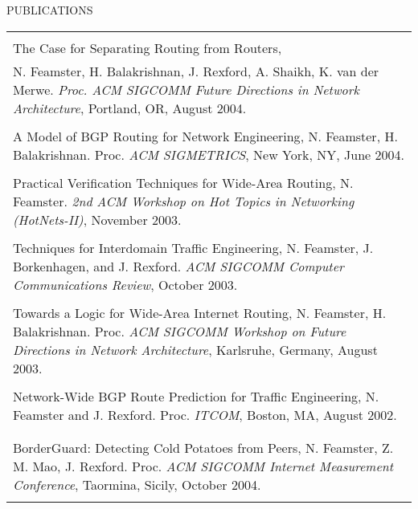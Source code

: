 \documentclass{article}
\begin{document}
\begin{flushleft}
\vspace{0.15 in}
{\ag PUBLICATIONS \hrulefill } \\
\vspace{0.1 in}
\begin{tabular}{p{7 in}}
\\
\hspace{-0.075in}{\bf Interdomain Routing: Modeling and Architecture}\\
{\sc The Case for Separating Routing from Routers}, \\
N. Feamster, H. Balakrishnan, J. Rexford, A. Shaikh, K. van der
Merwe. {\it Proc. ACM SIGCOMM Future Directions in Network
  Architecture}, Portland, OR, August 2004. \\ \\ 


{\sc A Model of BGP Routing for Network Engineering},
N. Feamster, H. Balakrishnan. Proc. {\it ACM
  SIGMETRICS}, New York, NY, June 2004. \\ \\

{\sc Practical Verification Techniques for Wide-Area Routing}, 
N. Feamster. {\it 2nd ACM 
  Workshop on Hot Topics in Networking (HotNets-II)}, November 2003.\\ \\ 

{\sc Techniques for Interdomain Traffic Engineering}, 
N. Feamster, J. Borkenhagen, and J. Rexford. {\it ACM SIGCOMM Computer
  Communications Review}, October 2003.\\ \\ 

{\sc Towards a Logic for Wide-Area Internet Routing},
N. Feamster, H. Balakrishnan. Proc. {\it ACM
  SIGCOMM Workshop on Future Directions in Network Architecture}, Karlsruhe, Germany, August 2003. \\ \\

{\sc Network-Wide BGP Route Prediction for Traffic Engineering},
N. Feamster and J. Rexford. Proc. {\it ITCOM}, Boston, MA, August
2002. \\ \\

\hspace{-0.075in}{\bf Routing Dynamics}\\

{\sc BorderGuard: Detecting Cold Potatoes from Peers},
N. Feamster, Z. M. Mao, J. Rexford. Proc. {\it ACM
  SIGCOMM Internet Measurement Conference}, Taormina, Sicily, October
2004. \\ \\ 



\end{tabular}
\end{flushleft}
\end{document}
